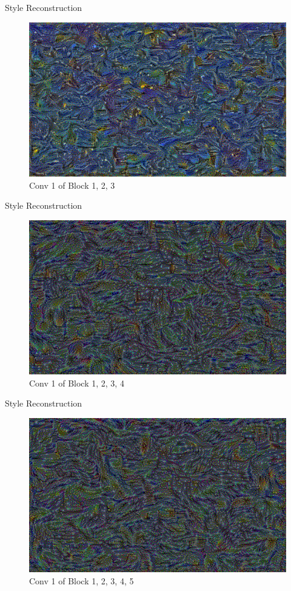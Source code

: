 \documentclass{beamer}
\begin{document}
\begin{frame}{Style Reconstruction}
\begin{figure}[ht]
\centering
\caption{Conv 1 of Block 1, 2, 3}
\includegraphics[width=\textwidth]{img/style/block3_conv1.png}
\end{figure}
\end{frame}

\begin{frame}{Style Reconstruction}
\begin{figure}[ht]
\centering
\caption{Conv 1 of Block 1, 2, 3, 4}
\includegraphics[width=\textwidth]{img/style/block4_conv1.png}
\end{figure}
\end{frame}

\begin{frame}{Style Reconstruction}
\begin{figure}[ht]
\centering
\caption{Conv 1 of Block 1, 2, 3, 4, 5}
\includegraphics[width=\textwidth]{img/style/block5_conv1.png}
\end{figure}
\end{frame}
\end{document}
